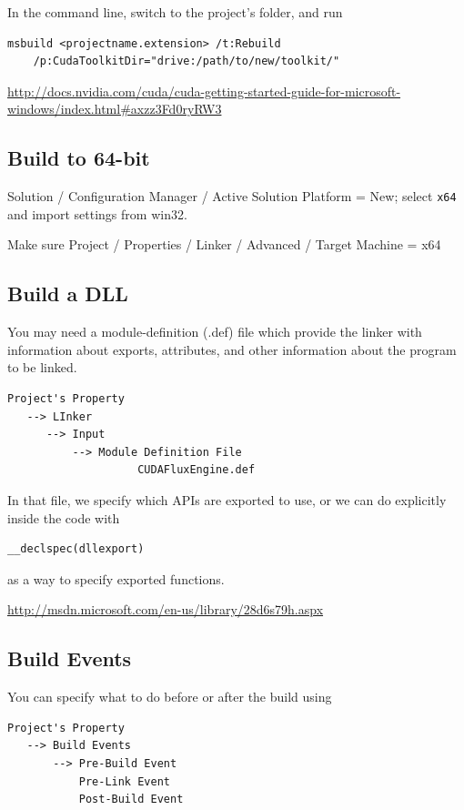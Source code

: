 In the command line, switch to the project's folder, and run
\begin{verbatim}
msbuild <projectname.extension> /t:Rebuild
    /p:CudaToolkitDir="drive:/path/to/new/toolkit/"
\end{verbatim}


\url{http://docs.nvidia.com/cuda/cuda-getting-started-guide-for-microsoft-windows/index.html#axzz3Fd0ryRW3}



\subsection{Build to 64-bit}

Solution / Configuration Manager / Active Solution Platform = New; select
\verb!x64! and import settings from win32.

Make sure Project / Properties / Linker / Advanced / Target Machine = x64

\subsection{Build a DLL}

You may need a module-definition (.def) file which 
 provide the linker with information about exports, attributes, and other
information about the program to be linked.

\begin{verbatim}
Project's Property
   --> LInker
      --> Input
          --> Module Definition File 
                    CUDAFluxEngine.def
\end{verbatim}

In that file, we specify which APIs are exported to use, or we can do explicitly
inside the code with
\begin{verbatim}
__declspec(dllexport) 
\end{verbatim}
as a way to specify exported functions.

\url{http://msdn.microsoft.com/en-us/library/28d6s79h.aspx}

\subsection{Build Events}
\label{sec:MSBuild_Events}

You can specify what to do before or after the build using
\begin{verbatim}
Project's Property
   --> Build Events
       --> Pre-Build Event
           Pre-Link Event
           Post-Build Event
\end{verbatim}

